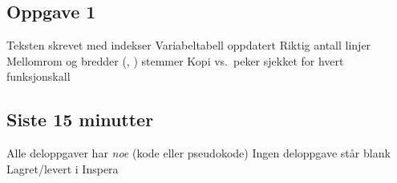 \subsection*{Oppgave 1}
\boks Teksten skrevet med indekser \quad \boks Variabeltabell oppdatert \quad \boks Riktig antall linjer\\
\boks Mellomrom og bredder (, ) stemmer \quad \boks Kopi vs.\ peker sjekket for hvert funksjonskall

\subsection*{Siste 15 minutter}
\boks Alle deloppgaver har \emph{noe} (kode eller pseudokode) \quad \boks Ingen deloppgave står blank\\
\boks Lagret/levert i Inspera
